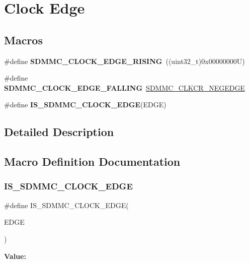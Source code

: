 \hypertarget{group___s_d_m_m_c___l_l___clock___edge}{}\section{Clock Edge}
\label{group___s_d_m_m_c___l_l___clock___edge}
\subsection*{Macros}
\begin{DoxyCompactItemize}
\item 
\mbox{\label{group___s_d_m_m_c___l_l___clock___edge_ga19c1914c3e992216f8f698053b9a0bd5}} 
\#define {\bfseries S\+D\+M\+M\+C\+\_\+\+C\+L\+O\+C\+K\+\_\+\+E\+D\+G\+E\+\_\+\+R\+I\+S\+I\+NG}~((uint32\+\_\+t)0x00000000\+U)
\item 
\mbox{\label{group___s_d_m_m_c___l_l___clock___edge_gaaa29a8b252a2ac0abd42b9d3ccdda229}} 
\#define {\bfseries S\+D\+M\+M\+C\+\_\+\+C\+L\+O\+C\+K\+\_\+\+E\+D\+G\+E\+\_\+\+F\+A\+L\+L\+I\+NG}~\mbox{\hyperlink{group___peripheral___registers___bits___definition_gab5575dd4b16e8f76db8ffa3ab84205e5}{S\+D\+M\+M\+C\+\_\+\+C\+L\+K\+C\+R\+\_\+\+N\+E\+G\+E\+D\+GE}}
\item 
\#define {\bfseries I\+S\+\_\+\+S\+D\+M\+M\+C\+\_\+\+C\+L\+O\+C\+K\+\_\+\+E\+D\+GE}(E\+D\+GE)
\end{DoxyCompactItemize}


\subsection{Detailed Description}


\subsection{Macro Definition Documentation}
\mbox{\label{group___s_d_m_m_c___l_l___clock___edge_ga72fd166e3e198a870b19ea186a62b56d}} 
\subsubsection{\texorpdfstring{IS\_SDMMC\_CLOCK\_EDGE}{IS\_SDMMC\_CLOCK\_EDGE}}
{\footnotesize\ttfamily \#define I\+S\+\_\+\+S\+D\+M\+M\+C\+\_\+\+C\+L\+O\+C\+K\+\_\+\+E\+D\+GE(\begin{DoxyParamCaption}\item[{}]{E\+D\+GE }\end{DoxyParamCaption})}

{\bfseries Value\+:}
\begin{DoxyCode}{0}

\end{DoxyCode}
